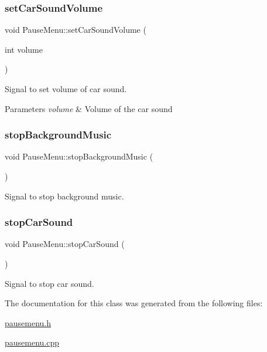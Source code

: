 \subsubsection{\texorpdfstring{setCarSoundVolume}{setCarSoundVolume}}
{\footnotesize\ttfamily void Pause\+Menu\+::set\+Car\+Sound\+Volume (\begin{DoxyParamCaption}\item[{int}]{volume }\end{DoxyParamCaption})\hspace{0.3cm}{\ttfamily [signal]}}



Signal to set volume of car sound. 


\begin{DoxyParams}{Parameters}
{\em volume} & Volume of the car sound \\
\hline
\end{DoxyParams}
\mbox{\label{class_pause_menu_a06f6d713caf70ef71c3bde13e4873a7c}} 
\subsubsection{\texorpdfstring{stopBackgroundMusic}{stopBackgroundMusic}}
{\footnotesize\ttfamily void Pause\+Menu\+::stop\+Background\+Music (\begin{DoxyParamCaption}{ }\end{DoxyParamCaption})\hspace{0.3cm}{\ttfamily [signal]}}



Signal to stop background music. 

\mbox{\label{class_pause_menu_a0d4bdd4e4dfabd83cb41eb872f15bb8a}} 
\subsubsection{\texorpdfstring{stopCarSound}{stopCarSound}}
{\footnotesize\ttfamily void Pause\+Menu\+::stop\+Car\+Sound (\begin{DoxyParamCaption}{ }\end{DoxyParamCaption})\hspace{0.3cm}{\ttfamily [signal]}}



Signal to stop car sound. 



The documentation for this class was generated from the following files\+:\begin{DoxyCompactItemize}
\item 
\mbox{\hyperlink{pausemenu_8h}{pausemenu.\+h}}\item 
\mbox{\hyperlink{pausemenu_8cpp}{pausemenu.\+cpp}}\end{DoxyCompactItemize}
